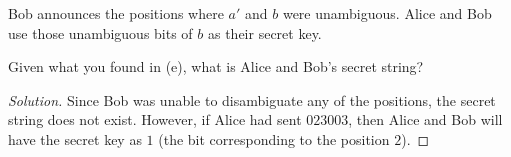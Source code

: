 \begin{solution}[label=ques:3f]
  \begin{question}
    Bob announces the positions where $a'$ and $b$ were unambiguous. Alice and Bob use those unambiguous bits of $b$ as their secret key.

Given what you found in (e), what is Alice and Bob's secret string?
  \end{question}
  \tcblower{}
  \begin{proof}[Solution]
    Since Bob was unable to disambiguate any of the positions, the secret string does not exist. However, if Alice had sent $023003$, then Alice and Bob will have the secret key as $1$ (the bit corresponding to the position $2$).
  \end{proof}
\end{solution}
